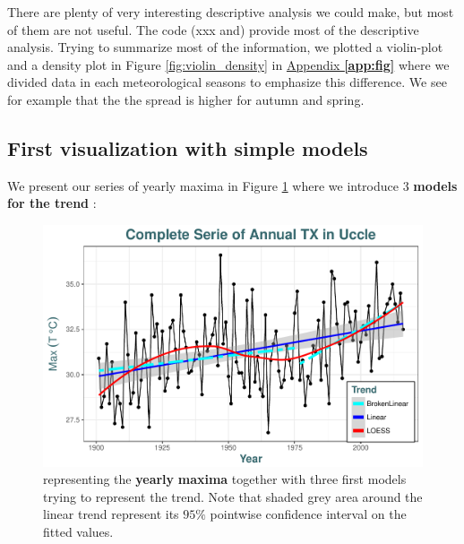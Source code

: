 There are plenty of very interesting descriptive analysis we could make, but most of them are not useful. The code (xxx and) provide most of the descriptive analysis. Trying to summarize most of the information, we plotted a violin-plot and a density plot in Figure \ref{fig:violin_density} in \hyperref[app:fig]{Appendix \textbf{\ref{app:fig}}} where we divided data in each meteorological seasons to emphasize this difference. We see for example that the the spread is higher for autumn and spring.

\subsection{First visualization with simple models}\label{sec:firstvisu}

We present our series of yearly maxima in Figure \ref{first_fig} where we introduce 3 \textbf{models for the trend} :


\begin{figure}[!htb]
	\centering\includegraphics[width=.8\linewidth]{gg12.pdf}\caption{representing the \textbf{yearly} \textbf{maxima} together with three first models trying to represent the trend. Note that shaded grey area around the linear trend represent its $95\%$ pointwise confidence interval on the fitted values. }%
\label{first_fig}
\end{figure}


